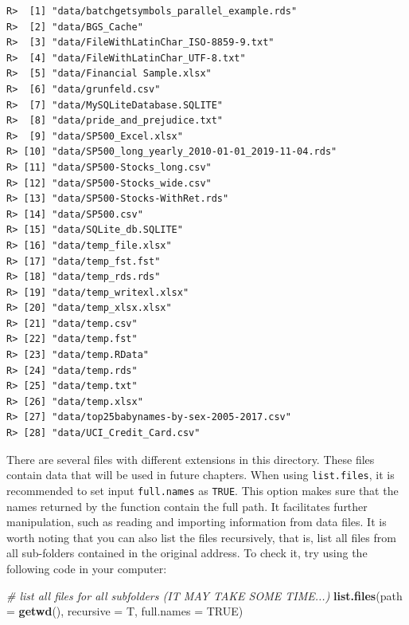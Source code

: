 \documentclass[
  12pt,
]{book}
\newenvironment{Shaded}{\begin{snugshade}}{\end{snugshade}}
\newcommand{\CommentTok}[1]{\textcolor[rgb]{0.37,0.37,0.37}{\textit{#1}}}
\newcommand{\DataTypeTok}[1]{\textcolor[rgb]{0.27,0.27,0.27}{#1}}
\newcommand{\KeywordTok}[1]{\textcolor[rgb]{0.27,0.27,0.27}{\textbf{#1}}}
\newcommand{\NormalTok}[1]{#1}
\newcommand{\OtherTok}[1]{\textcolor[rgb]{0.37,0.37,0.37}{#1}}
\begin{document}
\begin{verbatim}
R>  [1] "data/batchgetsymbols_parallel_example.rds"       
R>  [2] "data/BGS_Cache"                                  
R>  [3] "data/FileWithLatinChar_ISO-8859-9.txt"           
R>  [4] "data/FileWithLatinChar_UTF-8.txt"                
R>  [5] "data/Financial Sample.xlsx"                      
R>  [6] "data/grunfeld.csv"                               
R>  [7] "data/MySQLiteDatabase.SQLITE"                    
R>  [8] "data/pride_and_prejudice.txt"                    
R>  [9] "data/SP500_Excel.xlsx"                           
R> [10] "data/SP500_long_yearly_2010-01-01_2019-11-04.rds"
R> [11] "data/SP500-Stocks_long.csv"                      
R> [12] "data/SP500-Stocks_wide.csv"                      
R> [13] "data/SP500-Stocks-WithRet.rds"                   
R> [14] "data/SP500.csv"                                  
R> [15] "data/SQLite_db.SQLITE"                           
R> [16] "data/temp_file.xlsx"                             
R> [17] "data/temp_fst.fst"                               
R> [18] "data/temp_rds.rds"                               
R> [19] "data/temp_writexl.xlsx"                          
R> [20] "data/temp_xlsx.xlsx"                             
R> [21] "data/temp.csv"                                   
R> [22] "data/temp.fst"                                   
R> [23] "data/temp.RData"                                 
R> [24] "data/temp.rds"                                   
R> [25] "data/temp.txt"                                   
R> [26] "data/temp.xlsx"                                  
R> [27] "data/top25babynames-by-sex-2005-2017.csv"        
R> [28] "data/UCI_Credit_Card.csv"
\end{verbatim}

There are several files with different extensions in this directory. These files contain data that will be used in future chapters. When using \texttt{list.files}, it is recommended to set input \texttt{full.names} as \texttt{TRUE}. This option makes sure that the names returned by the function contain the full path. It facilitates further manipulation, such as reading and importing information from data files. It is worth noting that you can also list the files recursively, that is, list all files from all sub-folders contained in the original address. To check it, try using the following code in your computer:

\begin{Shaded}
\begin{Highlighting}[]
\CommentTok{# list all files for all subfolders (IT MAY TAKE SOME TIME...)}
\KeywordTok{list.files}\NormalTok{(}\DataTypeTok{path =} \KeywordTok{getwd}\NormalTok{(), }\DataTypeTok{recursive =}\NormalTok{ T, }\DataTypeTok{full.names =} \OtherTok{TRUE}\NormalTok{)}
\end{Highlighting}
\end{Shaded}
\end{document}
